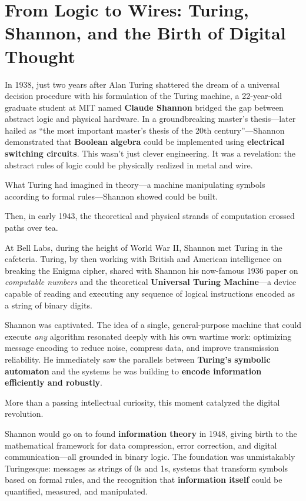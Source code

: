 \section{From Logic to Wires: Turing, Shannon, and the Birth of Digital Thought}

In 1938, just two years after Alan Turing shattered the dream of a universal decision procedure with his formulation of the Turing machine, a 22-year-old graduate student at MIT named \textbf{Claude Shannon} bridged the gap between abstract logic and physical hardware. In a groundbreaking master's thesis---later hailed as ``the most important master's thesis of the 20th century''---Shannon demonstrated that \textbf{Boolean algebra} could be implemented using \textbf{electrical switching circuits}. This wasn’t just clever engineering. It was a revelation: the abstract rules of logic could be physically realized in metal and wire.

What Turing had imagined in theory---a machine manipulating symbols according to formal rules---Shannon showed could be built.

Then, in early 1943, the theoretical and physical strands of computation crossed paths over tea.

At Bell Labs, during the height of World War II, Shannon met Turing in the cafeteria. Turing, by then working with British and American intelligence on breaking the Enigma cipher, shared with Shannon his now-famous 1936 paper on \textit{computable numbers} and the theoretical \textbf{Universal Turing Machine}---a device capable of reading and executing any sequence of logical instructions encoded as a string of binary digits.

Shannon was captivated. The idea of a single, general-purpose machine that could execute \emph{any} algorithm resonated deeply with his own wartime work: optimizing message encoding to reduce noise, compress data, and improve transmission reliability. He immediately saw the parallels between \textbf{Turing's symbolic automaton} and the systems he was building to \textbf{encode information efficiently and robustly}.

More than a passing intellectual curiosity, this moment catalyzed the digital revolution.

Shannon would go on to found \textbf{information theory} in 1948, giving birth to the mathematical framework for data compression, error correction, and digital communication---all grounded in binary logic. The foundation was unmistakably Turingesque: messages as strings of 0s and 1s, systems that transform symbols based on formal rules, and the recognition that \textbf{information itself} could be quantified, measured, and manipulated.

